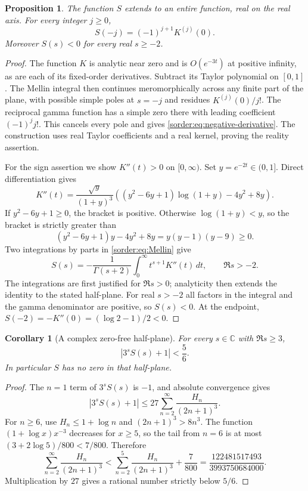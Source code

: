 \documentclass[11pt,a4paper]{article}
\newtheorem{proposition}[theorem]{Proposition}
\newtheorem{corollary}[theorem]{Corollary}
\theoremstyle{definition}
\theoremstyle{remark}
\numberwithin{equation}{section}
\begin{document}
\begin{proposition}\label{sorder:prop:entire}
The function $S$ extends to an entire function, real on the real axis.
For every integer $j\ge0$,
\begin{equation}\label{sorder:eq:negative-derivative}
 S(-j)=(-1)^{j+1}K^{(j)}(0).
\end{equation}
Moreover $S(s)<0$ for every real $s\ge-2$.
\end{proposition}
\begin{proof}
The function $K$ is analytic near zero and is $O(e^{-3t})$ at positive
infinity, as are each of its fixed-order derivatives. Subtract its
Taylor polynomial on $[0,1]$. The Mellin integral then continues
meromorphically across any finite part of the plane, with possible
simple poles at $s=-j$ and residues $K^{(j)}(0)/j!$.
The reciprocal gamma function has a simple zero there with leading
coefficient $(-1)^j j!$. This cancels every pole and gives
\eqref{sorder:eq:negative-derivative}. The construction uses real
Taylor coefficients and a real kernel, proving the reality assertion.

For the sign assertion we show $K''(t)>0$ on $[0,\infty)$. Set
$y=e^{-2t}\in(0,1]$. Direct differentiation gives
\begin{equation}\label{sorder:eq:Ksecond}
 K''(t)=\frac{\sqrt y}{(1+y)^3}
 \left((y^2-6y+1)\log(1+y)-4y^2+8y\right).
\end{equation}
If $y^2-6y+1\ge0$, the bracket is positive. Otherwise
$\log(1+y)<y$, so the bracket is strictly greater than
\[
 (y^2-6y+1)y-4y^2+8y=y(y-1)(y-9)\ge0.
\]
Two integrations by parts in \eqref{sorder:eq:Mellin} give
\begin{equation}\label{sorder:eq:twice-parts}
 S(s)=-\frac1{\Gamma(s+2)}
       \int_0^\infty t^{s+1}K''(t)\,dt,
       \qquad \Re s>-2.
\end{equation}
The integrations are first justified for $\Re s>0$; analyticity then
extends the identity to the stated half-plane. For real $s>-2$ all
factors in the integral and the gamma denominator are positive, so
$S(s)<0$. At the endpoint,
$S(-2)=-K''(0)=(\log2-1)/2<0$.
\end{proof}

\begin{corollary}[A complex zero-free half-plane]\label{sorder:cor:right-half-plane}
For every $s\in\mathbb C$ with $\Re s\ge3$,
\[
 |3^sS(s)+1|<\frac56.
\]
In particular $S$ has no zero in that half-plane.
\end{corollary}
\begin{proof}
The $n=1$ term of $3^sS(s)$ is $-1$, and absolute convergence gives
\[
 |3^sS(s)+1|\le27\sum_{n=2}^\infty\frac{H_n}{(2n+1)^3}.
\]
For $n\ge6$, use $H_n\le1+\log n$ and
$(2n+1)^3>8n^3$. The function $(1+\log x)x^{-3}$ decreases for
$x\ge5$, so the tail from $n=6$ is at most
$(3+2\log5)/800<7/800$. Therefore
\[
 \sum_{n=2}^\infty\frac{H_n}{(2n+1)^3}
 <\sum_{n=2}^5\frac{H_n}{(2n+1)^3}+\frac7{800}
 =\frac{122481517493}{3993750684000}.
\]
Multiplication by $27$ gives a rational number strictly below $5/6$.
\end{proof}
\end{document}

